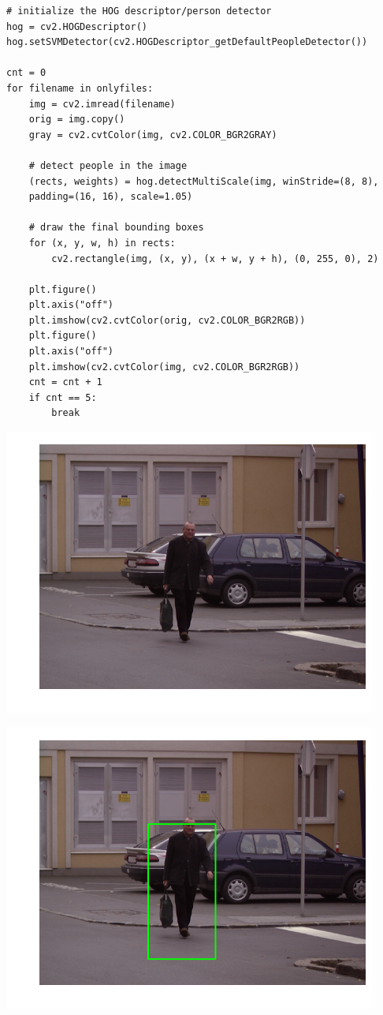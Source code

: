 \begin{verbatim}
# initialize the HOG descriptor/person detector
hog = cv2.HOGDescriptor()
hog.setSVMDetector(cv2.HOGDescriptor_getDefaultPeopleDetector())

cnt = 0
for filename in onlyfiles:
    img = cv2.imread(filename)
    orig = img.copy()
    gray = cv2.cvtColor(img, cv2.COLOR_BGR2GRAY)

    # detect people in the image
    (rects, weights) = hog.detectMultiScale(img, winStride=(8, 8),
    padding=(16, 16), scale=1.05)

    # draw the final bounding boxes
    for (x, y, w, h) in rects:
        cv2.rectangle(img, (x, y), (x + w, y + h), (0, 255, 0), 2)

    plt.figure()
    plt.axis("off")
    plt.imshow(cv2.cvtColor(orig, cv2.COLOR_BGR2RGB))
    plt.figure()
    plt.axis("off")
    plt.imshow(cv2.cvtColor(img, cv2.COLOR_BGR2RGB))
    cnt = cnt + 1
    if cnt == 5:
        break
\end{verbatim}

\includegraphics{facedetection_files/facedetection_62_0.png}

\includegraphics{facedetection_files/facedetection_62_1.png}

